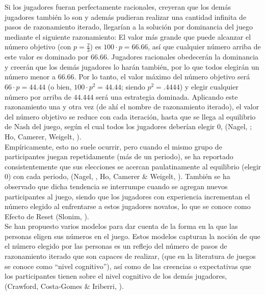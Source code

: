 Si los jugadores fueran perfectamente racionales, creyeran que los demás jugadores también lo son y además pudieran realizar una cantidad infinita de pasos de razonamiento iterado, llegarían a la solución por dominancia del juego mediante el siguiente razonamiento: El valor más grande que puede alcanzar el número objetivo (con $p = \frac{2}{3}$) es $100 \cdot p = 66.66$, así que cualquier número arriba de este valor es dominado por $66.66$. Jugadores racionales obedecerán la dominancia y creerán que los demás jugadores lo harán también, por lo que todos elegirán un número menor a $66.66$. Por lo tanto, el valor máximo del número objetivo será $66 \cdot p = 44.44$ (o bien, $100 \cdot p^2 = 44.44$; siendo $p^2=.4444$) y elegir cualquier número por arriba de $44.444$ será una estrategia dominada. Aplicando este razonamiento una y otra vez (de ahí el nombre de razonamiento iterado), el valor del número objetivo se reduce con cada iteración, hasta que se llega al equilibrio de Nash del juego, según el cual todos los jugadores deberían elegir $0$, (Nagel, \citeyear{Nagel}; Ho, Camerer, Weigelt, \citeyear{Ho}).\\

Empíricamente, esto no suele ocurrir, pero cuando el mismo grupo de participantes juegan repetidamente (más de un periodo), se ha reportado consistentemente que sus elecciones se acercan paulatinamente al equilibrio (elegir $0$) con cada periodo, (Nagel, \citeyear{Nagel}, Ho, Camerer & Weigelt, \citeyear{Ho}). También se ha observado que dicha tendencia se interrumpe cuando se agregan nuevos participantes al juego, siendo que los jugadores con experiencia incrementan el número elegido al enfrentarse a estos jugadores novatos, lo que se conoce como Efecto de Reset (Slonim, \citeyear{Slonim}).\\

Se han propuesto varios modelos para dar cuenta de la forma en la que las personas eligen sus números en el juego. Estos modelos capturan la noción de que el número elegido por las personas es un reflejo del número de pasos de razonamiento iterado que son capaces de realizar, (que en la literatura de juegos se conoce como “nivel cognitivo”), así como de las creencias o expectativas que los participantes tienen sobre el nivel cognitivo de los demás jugadores, (Crawford, Costa-Gomes & Iriberri, \citeyear{Crawford}).\\

